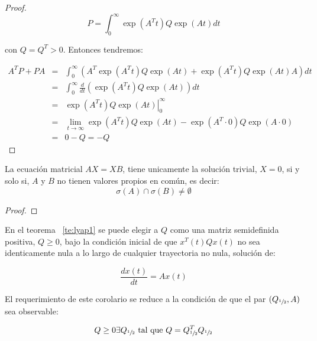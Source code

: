 \begin{proof}
        \begin{equation*}
            P = \int_0^{\infty} \exp{(A^Tt)} Q \exp(At) dt
        \end{equation*}

        con $Q = Q^T > 0$. Entonces tendremos:

        \begin{eqnarray*}
            A^T P + P A & = & \int_0^{\infty} \left( A^T \exp{(A^T t)} Q \exp{(At)} + \exp{(A^T t)} Q \exp{(At)} A \right) dt \\
            & = & \int_0^{\infty} \frac{d}{dt} \left( \exp{(A^T t)} Q \exp{(At)} \right) dt \\
            & = & \left. \exp{(A^T t)} Q \exp{(At)} \right|_0^{\infty} \\
            & = & \lim_{t \to \infty} \exp{(A^T t)} Q \exp{(At)} - \exp{(A^T \cdot 0)} Q \exp{(A \cdot 0)} \\
            & = & 0 - Q = - Q
        \end{eqnarray*}
    \end{proof}

    \begin{lema}
        La ecuación matricial $A X = X B$, tiene unicamente la solución trivial, $X=0$, si y solo si, $A$ y $B$ no tienen valores propios en común, es decir:
        \begin{equation*}
            \sigma(A) \cap \sigma(B) \ne \emptyset
        \end{equation*}
    \end{lema}

    \begin{proof}
    \end{proof}

    \begin{corolario}
        En el teorema ~\ref{te:lyap1} se puede elegir a $Q$ como una matriz semidefinida positiva, $Q \ge 0$, bajo la condición inicial de que $x^T(t) Q x(t)$ no sea identicamente nula a lo largo de cualquier trayectoria no nula, solución de:

        \begin{equation*}
            \frac{d x(t)}{dt} = A x(t)
        \end{equation*}

        El requerimiento de este corolario se reduce a la condición  de que el par $(Q_{\sfrac{1}{2}}, A)$ sea observable:

        \begin{equation*}
            Q \ge 0 \exists Q_{\sfrac{1}{2}} \text{ tal que } Q = Q_{\sfrac{1}{2}}^T Q_{\sfrac{1}{2}}
        \end{equation*}
    \end{corolario}

